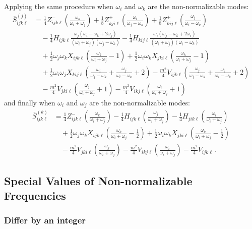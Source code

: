 \documentclass[letterpaper,11pt]{article}
\newcommand{\oi}{\omega_i}
\newcommand{\oj}{\omega_j}
\newcommand{\ok}{\omega_k}
\begin{document}
Applying the same procedure when $\oi$ and $\ok$ are the non-normalizable modes:
\begin{align}
\overline{S}^{(j)}_{ijk\ell} &= \frac{1}{4} Z^{-}_{ijk\ell} \left( \frac{\ok}{\oi + \oj} \right) + \frac{1}{8} Z^+_{kji\ell} \left( \frac{\oi}{\oj - \ok} \right) + \frac{1}{8} Z^+_{kij\ell} \left( \frac{\oj}{\oi - \ok} \right) \nonumber \\
%
& \quad - \frac{1}{4} H_{ijk\ell} \frac{\oj (\oi - \ok + 2\oj)}{(\oi + \oj)(\oj - \ok)} - \frac{1}{4} H_{kij\ell} \frac{ \oi (\oj - \ok + 2\oi)}{(\oi + \oj)(\oi - \ok)} \nonumber \\
%
& \quad + \frac{1}{2} \oj \ok X_{ijk\ell} \left( \frac{\ok}{\oi + \oj} - 1 \right) + \frac{1}{2} \oi \ok X_{jki\ell} \left( \frac{\ok}{\oi + \oj} - 1 \right) \nonumber \\
%
& \quad + \frac{1}{2} \oi \oj X_{kij\ell} \left( \frac{\oi}{\oj - \ok} + \frac{\oj}{\oi - \ok} + 2 \right) - \frac{m^2}{4} V_{ijk\ell} \left( \frac{\oj}{\oj - \ok} + \frac{\oi}{\oi - \ok} + 2 \right) \nonumber \\
%
& \quad - \frac{m^2}{4} V_{jki\ell} \left( \frac{\oj}{\oi + \oj} + 1 \right) - \frac{m^2}{4} V_{ikj\ell} \left( \frac{\oi}{\oi + \oj} + 1 \right) \, 
\end{align}
and finally when $\oi$ and $\oj$ are the non-normalizable modes:
\begin{align}
\overline{S}^{(k)}_{ijk\ell} &= \frac{1}{4} Z^{-}_{ijk\ell} \left( \frac{\ok}{\oi + \oj} \right) - \frac{1}{4} H_{ijk\ell} \left( \frac{\oj}{\oi + \oj} \right) - \frac{1}{4} H_{jik\ell} \left( \frac{\oi}{\oi + \oj} \right) \nonumber \\
%
& \quad + \frac{1}{2} \oj \ok X_{ijk\ell} \left( \frac{\ok}{\oi + \oj} - \frac{1}{2} \right) + \frac{1}{2} \oi \ok X_{jki\ell} \left( \frac{\ok}{\oi + \oj} - \frac{1}{2} \right) \nonumber \\
%
& \quad - \frac{m^2}{4} V_{jki\ell} \left( \frac{\oj}{\oi + \oj} \right) - \frac{m^2}{4} V_{ikj\ell} \left( \frac{\oi}{\oi + \oj} \right) - \frac{m^2}{4} V_{ijk\ell} \, .
\end{align}



\subsection{Special Values of Non-normalizable Frequencies}

\subsubsection{Differ by an integer}
\end{document}
